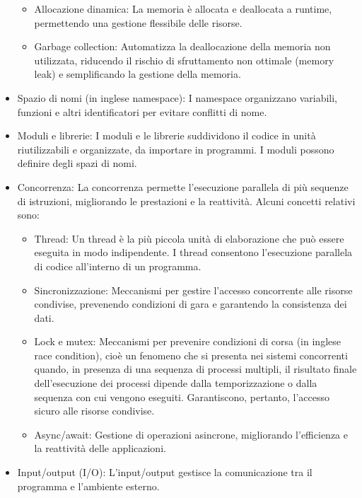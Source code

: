 \documentclass[
  letterpaper,
]{scrbook}
\providecommand{\tightlist}{%
  \setlength{\itemsep}{0pt}\setlength{\parskip}{0pt}}\usepackage{longtable,booktabs,array}
\begin{document}
\begin{itemize}
  \begin{itemize}
  \tightlist
  \item
    Allocazione dinamica: La memoria è allocata e deallocata a runtime,
    permettendo una gestione flessibile delle risorse.
  \item
    Garbage collection: Automatizza la deallocazione della memoria non
    utilizzata, riducendo il rischio di sfruttamento non ottimale
    (memory leak) e semplificando la gestione della memoria.
  \end{itemize}
\item
  Spazio di nomi (in inglese namespace): I namespace organizzano
  variabili, funzioni e altri identificatori per evitare conflitti di
  nome.
\item
  Moduli e librerie: I moduli e le librerie suddividono il codice in
  unità riutilizzabili e organizzate, da importare in programmi. I
  moduli possono definire degli spazi di nomi.
\item
  Concorrenza: La concorrenza permette l'esecuzione parallela di più
  sequenze di istruzioni, migliorando le prestazioni e la reattività.
  Alcuni concetti relativi sono:

  \begin{itemize}
  \tightlist
  \item
    Thread: Un thread è la più piccola unità di elaborazione che può
    essere eseguita in modo indipendente. I thread consentono
    l'esecuzione parallela di codice all'interno di un programma.
  \item
    Sincronizzazione: Meccanismi per gestire l'accesso concorrente alle
    risorse condivise, prevenendo condizioni di gara e garantendo la
    consistenza dei dati.
  \item
    Lock e mutex: Meccanismi per prevenire condizioni di corsa (in
    inglese race condition), cioè un fenomeno che si presenta nei
    sistemi concorrenti quando, in presenza di una sequenza di processi
    multipli, il risultato finale dell'esecuzione dei processi dipende
    dalla temporizzazione o dalla sequenza con cui vengono eseguiti.
    Garantiscono, pertanto, l'accesso sicuro alle risorse condivise.
  \item
    Async/await: Gestione di operazioni asincrone, migliorando
    l'efficienza e la reattività delle applicazioni.
  \end{itemize}
\item
  Input/output (I/O): L'input/output gestisce la comunicazione tra il
  programma e l'ambiente esterno.


\end{itemize}
\end{document}
